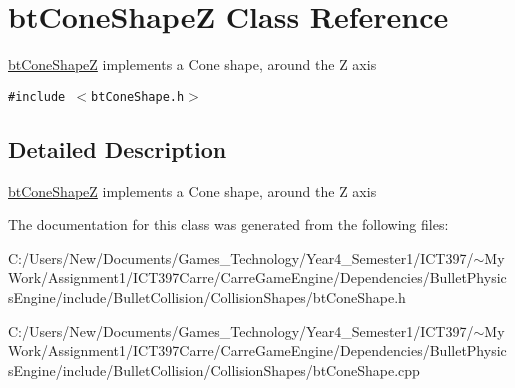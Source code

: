 \hypertarget{classbt_cone_shape_z}{
\section{btConeShapeZ Class Reference}
\label{classbt_cone_shape_z}
}
\hyperlink{classbt_cone_shape_z}{btConeShapeZ} implements a Cone shape, around the Z axis  


{\tt \#include $<$btConeShape.h$>$}



\subsection{Detailed Description}
\hyperlink{classbt_cone_shape_z}{btConeShapeZ} implements a Cone shape, around the Z axis 

The documentation for this class was generated from the following files:\begin{CompactItemize}
\item 
C:/Users/New/Documents/Games\_\-Technology/Year4\_\-Semester1/ICT397/$\sim$My Work/Assignment1/ICT397Carre/CarreGameEngine/Dependencies/BulletPhysicsEngine/include/BulletCollision/CollisionShapes/btConeShape.h\item 
C:/Users/New/Documents/Games\_\-Technology/Year4\_\-Semester1/ICT397/$\sim$My Work/Assignment1/ICT397Carre/CarreGameEngine/Dependencies/BulletPhysicsEngine/include/BulletCollision/CollisionShapes/btConeShape.cpp\end{CompactItemize}
